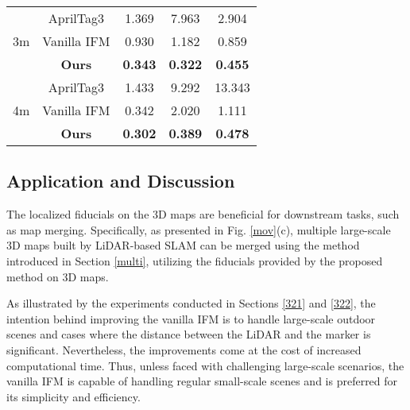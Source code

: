 \begin{table}[H]
\begin{center}
\begin{tabular}{c|c|c|c|c}
\multirow{3}{*}{ 3m} & AprilTag3 \cite{ap3} & 1.369&  7.963 & 2.904 \\ \cline{2-5} 
& Vanilla IFM & 0.930&  1.182 &  0.859 \\ \cline{2-5} 
& \textbf{Ours} &\textbf{ 0.343}& \textbf{ 0.322} & \textbf{ 0.455} \\ \cline{1-5}

\multirow{3}{*}{ 4m} & AprilTag3 \cite{ap3} & 1.433&  9.292 &  13.343 \\ \cline{2-5} 
& Vanilla IFM & 0.342&  2.020 &  1.111 \\ \cline{2-5} 
& \textbf{Ours} &\textbf{ 0.302}&  \textbf{0.389} &\textbf{ 0.478} \\ 
\hline \hline
\end{tabular}
\label{imtab3}

\end{center}
\end{table}



\subsection{Application and Discussion} 
The localized fiducials on the 3D maps are beneficial for downstream tasks, such as map merging. Specifically, as presented in Fig. \ref{mov}(c), multiple large-scale 3D maps built by LiDAR-based SLAM can be merged using the method introduced in Section \ref{multi}, utilizing the fiducials provided by the proposed method on 3D maps.\par
As illustrated by the experiments conducted in Sections \ref{321} and \ref{322}, the intention behind improving the vanilla IFM is to handle large-scale outdoor scenes and cases where the distance between the LiDAR and the marker is significant. Nevertheless, the improvements come at the cost of increased computational time. Thus, unless faced with challenging large-scale scenarios, the vanilla IFM is capable of handling regular small-scale scenes and is preferred for its simplicity and efficiency.
